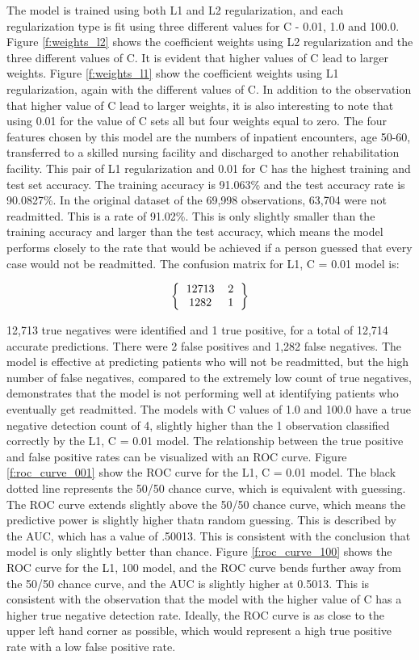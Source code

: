 \documentclass[sigconf]{acmart}
\begin{document}
The model is trained using both L1 and L2 regularization, and each regularization type is fit using three different values for C - 0.01, 1.0 and 100.0. Figure \ref{f:weights_l2} shows the coefficient weights using L2 regularization and the three different values of C. It is evident that higher values of C lead to larger weights. Figure \ref{f:weights_l1} show the coefficient weights using L1 regularization, again with the different values of C. In addition to the observation that higher value of C lead to larger weights, it is also interesting to note that using 0.01 for the value of C sets all but four weights equal to zero. The four features chosen by this model are the numbers of inpatient encounters, age 50-60, transferred to a skilled nursing facility and discharged to another rehabilitation facility. This pair of L1 regularization and 0.01 for C has the highest training and test set accuracy. The training accuracy is 91.063\% and the test accuracy rate is 90.0827\%. In the original dataset of the 69,998 observations, 63,704 were not readmitted. This is a rate of 91.02\%. This is only slightly smaller than the training accuracy and larger than the test accuracy, which means the model performs closely to the rate that would be achieved if a person guessed that every case would not be readmitted.
The confusion matrix for L1, C = 0.01 model is:

\[ 
\left \{
  \begin{tabular}{ccc}
  12713 & 2 \\
  1282 & 1 
  \end{tabular}
\right \}
\]

12,713 true negatives were identified and 1 true positive, for a total of 12,714 accurate predictions. There were 2 false positives and 1,282 false negatives. The model is effective at predicting patients who will not be readmitted, but the high number of false negatives, compared to the extremely low count of true negatives, demonstrates that the model is not performing well at identifying patients who eventually get readmitted. The models with C values of 1.0 and 100.0 have a true negative detection count of 4, slightly higher than the 1 observation classified correctly by the L1, C = 0.01 model.
The relationship between the true positive and false positive rates can be visualized with an ROC curve. Figure \ref{f:roc_curve_001} show the ROC curve for the L1, C = 0.01 model. The black dotted line represents the 50/50 chance curve, which is equivalent with guessing. The ROC curve extends slightly above the 50/50 chance curve, which means the predictive power is slightly higher thatn random guessing. This is described by the AUC, which has a value of .50013. This is consistent with the conclusion that model is only slightly better than chance. Figure \ref{f:roc_curve_100} shows the ROC curve for the L1, 100 model, and the ROC curve bends further away from the 50/50 chance curve, and the AUC is slightly higher at 0.5013. This is consistent with the observation that the model with the higher value of C has a higher true negative detection rate. Ideally, the ROC curve is as close to the upper left hand corner as possible, which would represent a high true positive rate with a low false positive rate.
\end{document}

